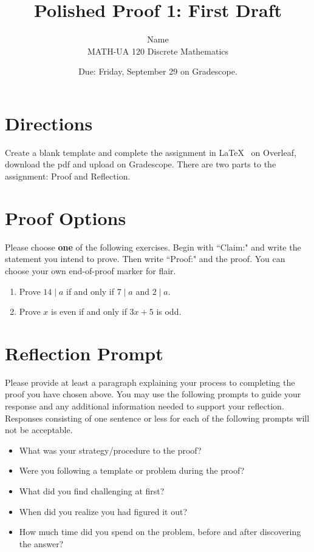 \documentclass{article}
\title{Polished Proof 1: First Draft}
\author{%
	Name
	\\
	MATH-UA 120 Discrete Mathematics
}
\date{Due: Friday, September 29 on Gradescope.}
\theoremstyle{definition}
\begin{document}
    \maketitle
	
\section*{Directions}
    Create a blank template and complete the assignment in \LaTeX~  on Overleaf, 
    download the pdf and upload on Gradescope. There are two parts to the assignment: Proof and Reflection.

\section*{Proof Options}
    Please choose \textbf{one} of the following exercises. Begin with ``Claim:" and write the statement you intend to prove. 
    Then write ``Proof:" and the proof. You can choose your own end-of-proof marker for flair.
    \begin{enumerate}
	\item Prove $14 \mid a$ if and only if $7 \mid a$ and $2\mid a$.
	\item Prove $x$ is even if and only if $3x+5$ is odd.
    \end{enumerate}

\section*{Reflection Prompt}
    Please provide at least a paragraph explaining your process to completing the proof you have chosen above. You may use the following prompts to guide your response and any additional information needed to support your reflection. Responses consisting of one sentence or less for each of the following prompts will not be acceptable.
    \begin{itemize}
        \item What was your strategy/procedure to the proof?
        \item Were you following a template or problem during the proof?
        \item What did you find challenging at first?
        \item When did you realize you had figured it out?
        \item How much time did you spend on the problem, before and after discovering the answer?
    \end{itemize}
\end{document}
